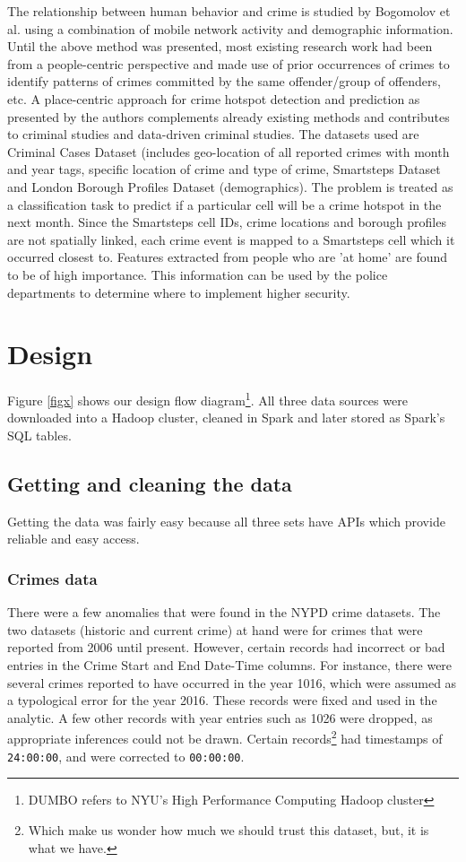 \documentclass{sigkddExp}
\begin{document}
The relationship between human behavior and crime is studied by Bogomolov et al. \cite{OUAC} using a combination of mobile network activity and demographic information. Until the above method was presented, most existing research work had been from a people-centric perspective and made use of prior occurrences of crimes to identify patterns of crimes committed by the same offender/group of offenders, etc. A place-centric approach for crime hotspot detection and prediction as presented by the authors complements already existing methods and contributes to criminal studies and data-driven criminal studies. 
The datasets used are Criminal Cases Dataset (includes geo-location of all reported crimes with month and year tags, specific location of crime and type of crime, Smartsteps Dataset and London Borough Profiles Dataset (demographics). The problem is treated as a classification task to predict if a particular cell will be a crime hotspot in the next month. Since the Smartsteps cell IDs, crime locations and borough profiles are not spatially linked, each crime event is mapped to a Smartsteps cell which it occurred closest to.  
Features extracted from people who are 'at home' are found to be of high importance. This information can be used by the police departments to determine where to implement higher security.

\section{Design}

Figure \ref{figx} shows our design flow diagram\footnote{DUMBO refers to NYU's High Performance Computing Hadoop cluster}. All three data sources were downloaded into a Hadoop cluster, cleaned in Spark and later stored as Spark's SQL tables. 

\subsection{Getting and cleaning the data}

Getting the data was fairly easy because all three sets have APIs which provide reliable and easy access.

\subsubsection{Crimes data}
There were a few anomalies that were found in the NYPD crime datasets. The two datasets (historic and current crime) at hand were for crimes that were reported from 2006 until present. However, certain records had incorrect or bad entries in the Crime Start and End Date-Time columns. For instance, there were several crimes reported to have occurred in the year 1016, which were assumed as a typological error for the year 2016. These records were fixed and used in the analytic. A few other records with year entries such as 1026 were dropped, as appropriate inferences could not be drawn. Certain records\footnote{Which make us wonder how much we should trust this dataset, but, it is what we have.} had timestamps of \texttt{24:00:00}, and were corrected to \texttt{00:00:00}.
\end{document}
